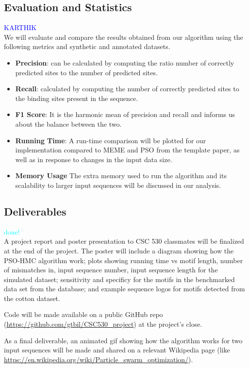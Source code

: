 \documentclass{article}
\begin{document}
\subsection{Evaluation and Statistics}
\textcolor{blue}{KARTHIK} \\
We will evaluate and compare the results obtained from our algorithm using the following metrics and synthetic and annotated datasets.
\begin{itemize}
	\item \textbf{Precision}: can be calculated by computing the ratio number of correctly predicted sites to the number of predicted sites.
	\item \textbf{Recall}: calculated by computing the number of correctly predicted sites to the binding sites present in the sequence.
	\item \textbf{F1 Score}: It is the harmonic mean of precision and recall and informs us about the balance between the two.
	\item \textbf{Running Time}: A run-time comparison will be plotted for our implementation compared to MEME and PSO from the template paper, as well as in response to changes in the input data size.
	\item \textbf{Memory Usage} The extra memory used to run the algorithm and its scalability to larger input sequences will be discussed in our analysis.
\end{itemize}
\subsection{Deliverables}
\textcolor{cyan}{done!} \\
A project report and poster presentation to CSC 530 classmates will be finalized at the end of the project. The poster will include a diagram showing how the PSO-HMC algorithm work; plots showing running time vs motif length, number of mismatches in, input sequence number, input sequence length for the simulated dataset; sensitivity and specificy for the motifs in the benchmarked data set from the database; and example sequence logos for motifs detected from the cotton dataset.  
  
  Code will be made available on a public GitHub repo (\url{https://github.com/gtbil/CSC530_project}) at the project's close.  
  
  As a final deliverable, an animated gif showing how the algorithm works for two input sequences will be made and shared on a relevant Wikipedia page (like \url{https://en.wikipedia.org/wiki/Particle_swarm_optimization/}).
\end{document}
